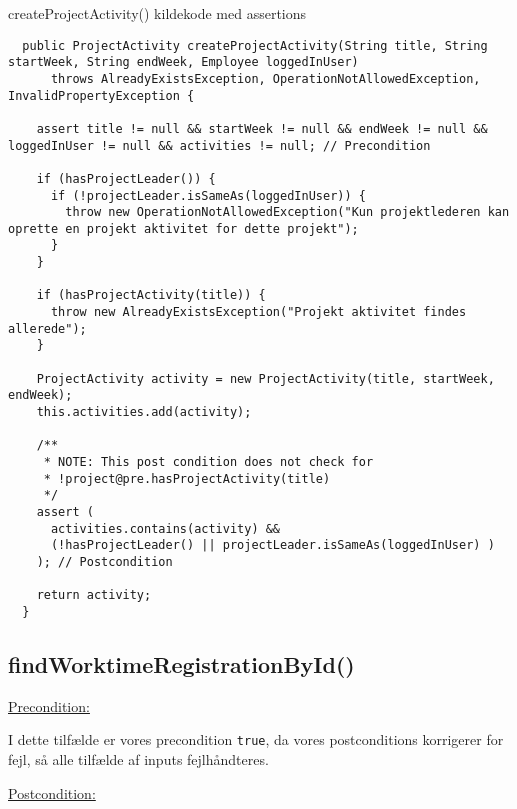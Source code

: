 \begin{listing}[H]
    \centering
    \caption{createProjectActivity() kildekode med assertions}\label{lst:create_project_activity_assertions}
    \begin{verbatim}
  public ProjectActivity createProjectActivity(String title, String startWeek, String endWeek, Employee loggedInUser)
      throws AlreadyExistsException, OperationNotAllowedException, InvalidPropertyException {

    assert title != null && startWeek != null && endWeek != null && loggedInUser != null && activities != null; // Precondition

    if (hasProjectLeader()) {
      if (!projectLeader.isSameAs(loggedInUser)) {
        throw new OperationNotAllowedException("Kun projektlederen kan oprette en projekt aktivitet for dette projekt");
      }
    }

    if (hasProjectActivity(title)) {
      throw new AlreadyExistsException("Projekt aktivitet findes allerede");
    }

    ProjectActivity activity = new ProjectActivity(title, startWeek, endWeek);
    this.activities.add(activity);

    /**
     * NOTE: This post condition does not check for 
     * !project@pre.hasProjectActivity(title)
     */
    assert (
      activities.contains(activity) &&
      (!hasProjectLeader() || projectLeader.isSameAs(loggedInUser) )
    ); // Postcondition

    return activity;
  }
    \end{verbatim}
\end{listing}


\subsection{findWorktimeRegistrationById()} \label{sec:contract_findd_work}
\noindent \underline{Precondition:}
\vspace{4pt}


I dette tilfælde er vores precondition \texttt{true}, da vores postconditions korrigerer for fejl, så alle tilfælde af inputs fejlhåndteres.
\vspace{4pt}

\noindent
\underline{Postcondition:}
\vspace{4pt}

